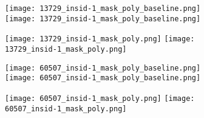 \begin{figure}[H]
	\centering
	\begin{minipage}{\linewidth}
		\centering
		\begin{subfigure}[b]{0.45\linewidth}
			\begin{minipage}{\linewidth}
				\centering
				\texttt{[image: 13729\_insid-1\_mask\_poly\_baseline.png]}
				{\texttt{[image: 13729\_insid-1\_mask\_poly\_baseline.png]}}
			\end{minipage}
		\end{subfigure}
		\begin{subfigure}[b]{0.45\linewidth}
			\begin{minipage}{\linewidth}
				\centering
				\texttt{[image: 13729\_insid-1\_mask\_poly.png]}
				{\texttt{[image: 13729\_insid-1\_mask\_poly.png]}}
			\end{minipage}
		\end{subfigure}

		\vskip5pt
		\begin{subfigure}[b]{0.45\linewidth}
			\begin{minipage}{\linewidth}
				\centering
				{\texttt{[image: 60507\_insid-1\_mask\_poly\_baseline.png]}}
				{\texttt{[image: 60507\_insid-1\_mask\_poly\_baseline.png]}}
			\end{minipage}
		\end{subfigure}
		\begin{subfigure}[b]{0.45\linewidth}
			\begin{minipage}{\linewidth}
				\centering
				{\texttt{[image: 60507\_insid-1\_mask\_poly.png]}}
				{\texttt{[image: 60507\_insid-1\_mask\_poly.png]}}
			\end{minipage}
		\end{subfigure}


\end{minipage}
\end{figure}
